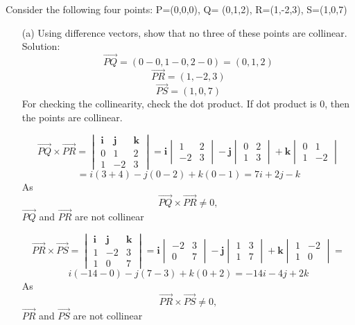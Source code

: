 Consider the following four points: P=(0,0,0), Q= (0,1,2), R=(1,-2,3), S=(1,0,7)
\begin{enumerate}
    \item[(a)] Using difference vectors, show that no three of these points are collinear.\\
    
    Solution:
   \[
    \vec{PQ}= (0-0, 1-0, 2-0) = (0,1,2)
    \]
    \[
   \vec{PR} = (1,-2,3)
    \]
    \[
   \vec{PS}= (1,0,7)
    \]
    For checking the collinearity, check the dot product. If dot product is 0, then the points are collinear.
  

    \[
\vec{PQ} \times \vec{PR} =
\begin{vmatrix}
\mathbf{i} & \mathbf{j} & \mathbf{k} \\
0 & 1 & 2 \\
1 & -2 & 3
\end{vmatrix}
= \mathbf{i} \begin{vmatrix} 1 & 2 \\ -2 & 3 \end{vmatrix}
- \mathbf{j} \begin{vmatrix} 0 & 2 \\ 1 & 3 \end{vmatrix}
+ \mathbf{k} \begin{vmatrix} 0 & 1 \\ 1 & -2 \end{vmatrix}
\]
\[
 = i(3+4)-j(0-2)+k(0-1) = 7i+2j-k
\]
As
\[
\vec{PQ} \times \vec{PR} \neq 0, 
\]
$\vec{PQ}$ and $\vec{PR}$ are not collinear

    \[
\vec{PR} \times \vec{PS} =
\begin{vmatrix}
\mathbf{i} & \mathbf{j} & \mathbf{k} \\
1 & -2 & 3 \\
1 & 0 & 7
\end{vmatrix}
= \mathbf{i} \begin{vmatrix} -2 & 3 \\ 0 & 7 \end{vmatrix}
- \mathbf{j} \begin{vmatrix} 1 & 3 \\ 1 & 7 \end{vmatrix}
+ \mathbf{k} \begin{vmatrix} 1 & -2 \\ 1 & 0 \end{vmatrix} =
\]
\[
i(-14-0)-j(7-3)+k(0+2) = -14i-4j+2k
\]
As
\[
\vec{PR} \times \vec{PS} \neq 0, 
\]
$\vec{PR}$ and $\vec{PS}$ are not collinear


\end{enumerate}
